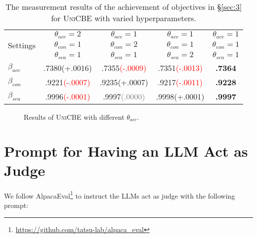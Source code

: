 \begin{table}[h]
\renewcommand\arraystretch{1.4}
\centering
\setlength{\tabcolsep}{0.6em} 
\vspace{-0.1cm}
\caption{The measurement results of the achievement of objectives in \S\ref{sec:3} for \textsc{UniCBE} with varied hyperparameters.}
\begin{tabular}{lcccc}
\toprule
\multirow{3}{*}{Settings}&$\theta_{acc} = 2$&$\theta_{acc} = 1$&$\theta_{acc} = 1$&$\theta_{acc} = 1$\\
\multirow{3}{*}{}&$\theta_{con} = 1$&$\theta_{con} = 2$&$\theta_{con} = 1$&$\theta_{con} = 1$\\
\multirow{3}{*}{}&$\theta_{sca} = 1$&$\theta_{sca} = 1$&$\theta_{sca} = 2$&$\theta_{sca} = 1$\\
\midrule
$\beta_{acc}$&.7380\tiny \textcolor{mygreen}{(+.0016)}&.7355\tiny \textcolor{red}{(-.0009)}&.7351\tiny \textcolor{red}{(-.0013)}&\textbf{.7364}\\
$\beta_{con}$&.9221\tiny \textcolor{red}{(-.0007)}&.9235\tiny \textcolor{mygreen}{(+.0007)}&.9217\tiny \textcolor{red}{(-.0011)}&\textbf{.9228}\\
$\beta_{sca}$&.9996\tiny \textcolor{red}{(-.0001)}&.9997\tiny \textcolor{gray}{(.0000)}&.9998\tiny \textcolor{mygreen}{(+.0001)}&\textbf{.9997}\\
\bottomrule
\end{tabular}
\vspace{-0.4cm}
\label{tab:beta_theta}
\end{table}
\begin{figure}[h]
    \centering
    \hfill
    \hfill
    \vspace{-0.2cm}
    \caption{Results of \textsc{UniCBE} with different $\theta_{acc}$. }
    \vspace{-0.4cm}
    \label{fig:theta}
\end{figure}




\section{Prompt for Having an LLM Act as Judge}
\label{app:prompt}
We follow AlpacaEval\footnote{\url{https://github.com/tatsu-lab/alpaca_eval}} to instruct the LLMs act as judge with the following prompt:

